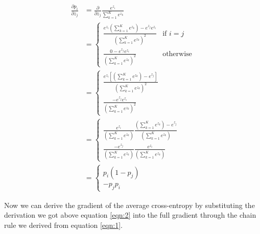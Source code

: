 \documentclass[letter]{article}
\begin{document}
\begin{align*}
\frac{\partial{p_i}}{\partial{z_j}} &= \frac{\partial{}}{\partial{z_j}} \frac{e^{z_i}}{\sum_{k = 1}^K e^{z_k}} \\
&=
\begin{cases}
    \frac{e^{z_i} \left(\sum_{k = 1}^K e^{z_k}\right) - e^{z_j} e^{z_i}}{\left(\sum_{k = 1}^K e^{z_k}\right)^2} & \text{if } i = j \\
    \frac{0 - e^{z_j} e^{z_i}}{\left(\sum_{k = 1}^K e^{z_k}\right)^2} & \text{otherwise}
\end{cases} \\
&=
\begin{cases}
    \frac{e^{z_i} \left[ \left(\sum_{k = 1}^K e^{z_k}\right) - e^{z_j} \right]}{\left(\sum_{k = 1}^K e^{z_k}\right)^2} & \\
    \frac{-e^{z_j} e^{z_i}}{\left(\sum_{k = 1}^K e^{z_k}\right)^2} &
\end{cases} \\
&=
\begin{cases}
    \frac{e^{z_i}}{\left(\sum_{k = 1}^K e^{z_k}\right)} \frac{\left(\sum_{k = 1}^K e^{z_k}\right) - e^{z_j}}{\left(\sum_{k = 1}^K e^{z_k}\right)} & \\
    \frac{-e^{z_j}}{\left(\sum_{k = 1}^K e^{z_k}\right)} \frac{e^{z_i}}{\left(\sum_{k = 1}^K e^{z_k}\right)} &
\end{cases} \\
&= \label{eqn:2} \tag{2}
\begin{cases}
    p_i (1 - p_j) & \\
    -p_j p_i &
\end{cases}
\end{align*}

\newpage

\noindent
Now we can derive the gradient of the average cross-entropy by substituting the derivation we got above equation \ref{eqn:2} into the full gradient through the chain rule we derived from equation \ref{eqn:1}.
\end{document}
